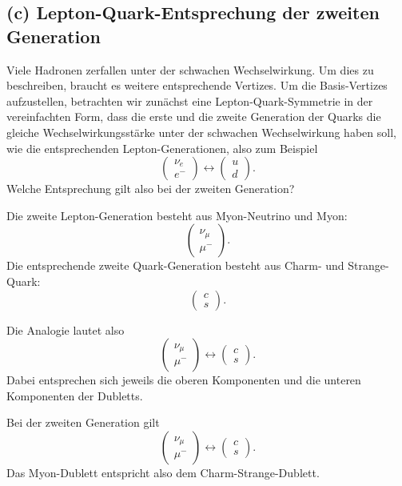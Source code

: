 \documentclass[11pt,a4paper]{scrartcl}
\begin{document}
\subsection*{(c) Lepton-Quark-Entsprechung der zweiten Generation}

Viele Hadronen zerfallen unter der schwachen Wechselwirkung. Um dies zu beschreiben, braucht es weitere entsprechende Vertizes. Um die Basis-Vertizes aufzustellen, betrachten wir zunächst eine Lepton-Quark-Symmetrie in der vereinfachten Form, dass die erste und die zweite Generation der Quarks die gleiche Wechselwirkungsstärke unter der schwachen Wechselwirkung haben soll, wie die entsprechenden Lepton-Generationen, also zum Beispiel
\[
\begin{pmatrix}\nu_e\\ e^-\end{pmatrix}
\leftrightarrow
\begin{pmatrix}u\\ d\end{pmatrix}.
\]
Welche Entsprechung gilt also bei der zweiten Generation?

\begin{calculationbox}
Die zweite Lepton-Generation besteht aus Myon-Neutrino und Myon:
\[
\begin{pmatrix}
\nu_\mu\\
\mu^-
\end{pmatrix}.
\]
Die entsprechende zweite Quark-Generation besteht aus Charm- und Strange-Quark:
\[
\begin{pmatrix}
c\\
s
\end{pmatrix}.
\]
\begin{calculationbox}
Die Analogie lautet also
\[
\boxed{
\begin{pmatrix}
\nu_\mu\\
\mu^-
\end{pmatrix}
\leftrightarrow
\begin{pmatrix}
c\\
s
\end{pmatrix}}
.
\]
Dabei entsprechen sich jeweils die oberen Komponenten und die unteren Komponenten der Dubletts.
\end{calculationbox}
\end{calculationbox}

\begin{answerbox}
Bei der zweiten Generation gilt
\[
\boxed{
\begin{pmatrix}
\nu_\mu\\
\mu^-
\end{pmatrix}
\leftrightarrow
\begin{pmatrix}
c\\
s
\end{pmatrix}}
.
\]
Das Myon-Dublett entspricht also dem Charm-Strange-Dublett.
\end{answerbox}
\end{document}

